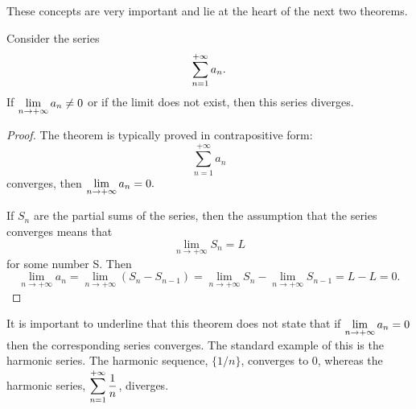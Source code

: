 These concepts are very important and lie at the heart of the next two theorems.

\begin{theorem}\label{thm:series_nth_term}
Consider the series $$\displaystyle\sum_{n=1}^{+\infty} a_n.$$ If $\displaystyle \lim_{n\to+\infty}a_n \neq 0$ or if the limit does not exist, then this series diverges.
\end{theorem}

\ifanalysis

	\checkoddpage
{}
\begin{proof}
The theorem is typically proved in contrapositive form:
$$
\displaystyle \sum _{n=1}^{+\infty}a_{n}
$$
 converges, then $\displaystyle \lim _{n\to+\infty }a_{n}=0.$

If $S_n$ are the partial sums of the series, then the assumption that the series converges means that
$$
\displaystyle \lim _{n\to+\infty }S_{n}=L
$$
for some number S. Then
$$
\displaystyle \lim _{n\to+\infty }a_{n}=\lim _{n\to+\infty }(S_{n}-S_{n-1})=\lim _{n\to+\infty }S_{n}-\lim _{n\to+\infty }S_{n-1}=L-L=0.
$$


\end{proof}



\fi

It is important to underline that this theorem does not state that if $\displaystyle \lim_{n\to+\infty} a_n = 0$ then the corresponding series converges. The standard example of this is the harmonic series. The harmonic sequence, $\{1/n\}$, converges to 0, whereas the harmonic series, $\displaystyle \sum_{n=1}^{+\infty} \frac1n$, diverges.

